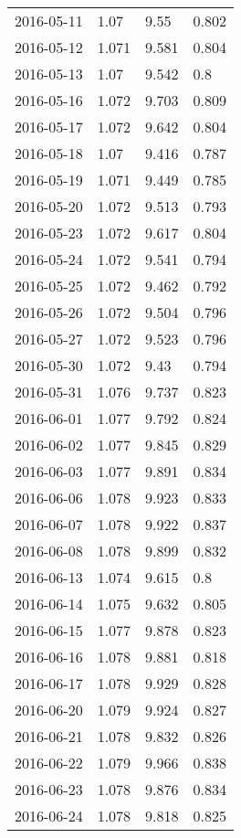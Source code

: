 \begin{center}
\begin{longtable}{r lll}
    2016-05-11 & 1.07   & 9.55   & 0.802  \\
    2016-05-12 & 1.071  & 9.581  & 0.804  \\
    2016-05-13 & 1.07   & 9.542  & 0.8    \\
    2016-05-16 & 1.072  & 9.703  & 0.809  \\
    2016-05-17 & 1.072  & 9.642  & 0.804  \\
    2016-05-18 & 1.07   & 9.416  & 0.787  \\
    2016-05-19 & 1.071  & 9.449  & 0.785  \\
    2016-05-20 & 1.072  & 9.513  & 0.793  \\
    2016-05-23 & 1.072  & 9.617  & 0.804  \\
    2016-05-24 & 1.072  & 9.541  & 0.794  \\
    2016-05-25 & 1.072  & 9.462  & 0.792  \\
    2016-05-26 & 1.072  & 9.504  & 0.796  \\
    2016-05-27 & 1.072  & 9.523  & 0.796  \\
    2016-05-30 & 1.072  & 9.43   & 0.794  \\
    2016-05-31 & 1.076  & 9.737  & 0.823  \\
    2016-06-01 & 1.077  & 9.792  & 0.824  \\
    2016-06-02 & 1.077  & 9.845  & 0.829  \\
    2016-06-03 & 1.077  & 9.891  & 0.834  \\
    2016-06-06 & 1.078  & 9.923  & 0.833  \\
    2016-06-07 & 1.078  & 9.922  & 0.837  \\
    2016-06-08 & 1.078  & 9.899  & 0.832  \\
    2016-06-13 & 1.074  & 9.615  & 0.8    \\
    2016-06-14 & 1.075  & 9.632  & 0.805  \\
    2016-06-15 & 1.077  & 9.878  & 0.823  \\
    2016-06-16 & 1.078  & 9.881  & 0.818  \\
    2016-06-17 & 1.078  & 9.929  & 0.828  \\
    2016-06-20 & 1.079  & 9.924  & 0.827  \\
    2016-06-21 & 1.078  & 9.832  & 0.826  \\
    2016-06-22 & 1.079  & 9.966  & 0.838  \\
    2016-06-23 & 1.078  & 9.876  & 0.834  \\
    2016-06-24 & 1.078  & 9.818  & 0.825  \\

\end{longtable}
\end{center}

